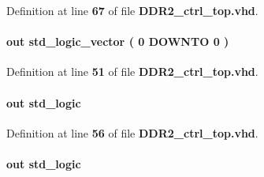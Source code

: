 Definition at line {\bf 67} of file {\bf D\+D\+R2\+\_\+ctrl\+\_\+top.\+vhd}.

\paragraph[{mem\+\_\+odt}]{ {\bfseries \textcolor{keywordflow}{out}\textcolor{vhdlchar}{ }} {\bfseries \textcolor{comment}{std\+\_\+logic\+\_\+vector}\textcolor{vhdlchar}{ }\textcolor{vhdlchar}{(}\textcolor{vhdlchar}{ }\textcolor{vhdlchar}{ } \textcolor{vhdldigit}{0} \textcolor{vhdlchar}{ }\textcolor{keywordflow}{D\+O\+W\+N\+TO}\textcolor{vhdlchar}{ }\textcolor{vhdlchar}{ } \textcolor{vhdldigit}{0} \textcolor{vhdlchar}{ }\textcolor{vhdlchar}{)}\textcolor{vhdlchar}{ }} \hspace{0.3cm}{\ttfamily [Port]}}\label{classDDR2__ctrl__top_a121dba4ade7d2721655a32b9032be8a1}


Definition at line {\bf 51} of file {\bf D\+D\+R2\+\_\+ctrl\+\_\+top.\+vhd}.

\paragraph[{mem\+\_\+ras\+\_\+n}]{ {\bfseries \textcolor{keywordflow}{out}\textcolor{vhdlchar}{ }} {\bfseries \textcolor{comment}{std\+\_\+logic}\textcolor{vhdlchar}{ }} \hspace{0.3cm}{\ttfamily [Port]}}\label{classDDR2__ctrl__top_a893ace9b632d35310a7cf5e2f1b3a1c3}


Definition at line {\bf 56} of file {\bf D\+D\+R2\+\_\+ctrl\+\_\+top.\+vhd}.

\paragraph[{mem\+\_\+we\+\_\+n}]{ {\bfseries \textcolor{keywordflow}{out}\textcolor{vhdlchar}{ }} {\bfseries \textcolor{comment}{std\+\_\+logic}\textcolor{vhdlchar}{ }} \hspace{0.3cm}{\ttfamily [Port]}}\label{classDDR2__ctrl__top_a3aabbfab3ba48c3d77176a1c7caf2bce}


